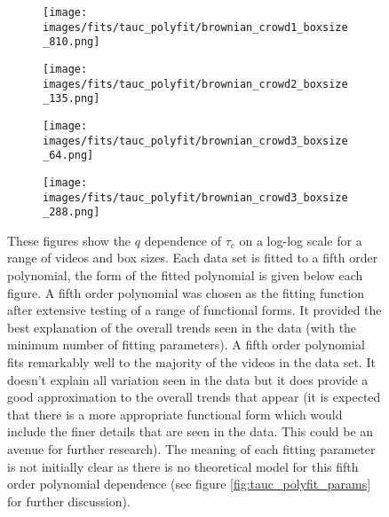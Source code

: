 \documentclass[10pt]{article}
\begin{document}
\begin{figure}[H]
\begin{subfigure}[t]{.5\textwidth}
  \centering
 \texttt{[image: images/fits/tauc\_polyfit/brownian\_crowd1\_boxsize\_810.png]}
  \caption{}
\end{subfigure}%
\hfill
\begin{subfigure}[t]{.5\textwidth}
  \centering
  \texttt{[image: images/fits/tauc\_polyfit/brownian\_crowd2\_boxsize\_135.png]}
  \caption{}
\end{subfigure}
\par\bigskip
\begin{subfigure}[t]{.5\textwidth}
  \centering
 \texttt{[image: images/fits/tauc\_polyfit/brownian\_crowd3\_boxsize\_64.png]}
  \caption{}
\end{subfigure}%
\hfill
\begin{subfigure}[t]{.5\textwidth}
  \centering
  \texttt{[image: images/fits/tauc\_polyfit/brownian\_crowd3\_boxsize\_288.png]}
  \caption{}
\end{subfigure}
\caption{These figures show the $q$ dependence of $\tau_c$ on a log-log scale for a range of videos and box sizes. Each data set is fitted to a fifth order polynomial, the form of the fitted polynomial is given below each figure. A fifth order polynomial was chosen as the fitting function after extensive testing of a range of functional forms. It provided the best explanation of the overall trends seen in the data (with the minimum number of fitting parameters). A fifth order polynomial fits remarkably well to the majority of the videos in the data set. It doesn't explain all variation seen in the data but it does provide a good approximation to the overall trends that appear (it is expected that there is a more appropriate functional form which would include the finer details that are seen in the data. This could be an avenue for further research). The meaning of each fitting parameter is not initially clear as there is no theoretical model for this fifth order polynomial dependence (see figure \ref{fig:tauc_polyfit_params} for further discussion).}
\label{fig:tauc_polyfit1}
\end{figure}
\end{document}
